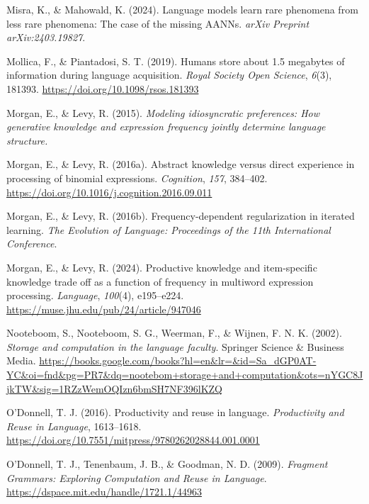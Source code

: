 \documentclass[
  12pt,
  letterpaper,
]{scrreprt}
\newlength{\cslhangindent}
\newenvironment{CSLReferences}[2] %
 {\begin{list}{}{%
  \setlength{\itemindent}{0pt}
  \setlength{\leftmargin}{0pt}
  \setlength{\parsep}{0pt}
  \ifodd #1
   \setlength{\leftmargin}{\cslhangindent}
   \setlength{\itemindent}{-1\cslhangindent}
  \fi
  \setlength{\itemsep}{#2\baselineskip}}}
 {\end{list}}
\begin{document}
\begin{CSLReferences}{1}{0}
Misra, K., \& Mahowald, K. (2024). Language models learn rare phenomena
from less rare phenomena: The case of the missing AANNs. \emph{arXiv
Preprint arXiv:2403.19827}.

Mollica, F., \& Piantadosi, S. T. (2019). Humans store about 1.5
megabytes of information during language acquisition. \emph{Royal
Society Open Science}, \emph{6}(3), 181393.
\url{https://doi.org/10.1098/rsos.181393}

Morgan, E., \& Levy, R. (2015). \emph{Modeling idiosyncratic
preferences: How generative knowledge and expression frequency jointly
determine language structure.}

Morgan, E., \& Levy, R. (2016a). Abstract knowledge versus direct
experience in processing of binomial expressions. \emph{Cognition},
\emph{157}, 384--402.
\url{https://doi.org/10.1016/j.cognition.2016.09.011}

Morgan, E., \& Levy, R. (2016b). Frequency-dependent regularization in
iterated learning. \emph{The Evolution of Language: Proceedings of the
11th International Conference}.

Morgan, E., \& Levy, R. (2024). Productive knowledge and item-specific
knowledge trade off as a function of frequency in multiword expression
processing. \emph{Language}, \emph{100}(4), e195--e224.
\url{https://muse.jhu.edu/pub/24/article/947046}

Nooteboom, S., Nooteboom, S. G., Weerman, F., \& Wijnen, F. N. K.
(2002). \emph{Storage and computation in the language faculty}. Springer
Science \& Business Media.
\url{https://books.google.com/books?hl=en&lr=&id=Sa_dGP0AT-YC&oi=fnd&pg=PR7&dq=nootebom+storage+and+computation&ots=nYGC8JjkTW&sig=1RZzWemOQIzn6bmSH7NF396lKZQ}

O'Donnell, T. J. (2016). Productivity and reuse in language.
\emph{Productivity and Reuse in Language}, 1613--1618.
\url{https://doi.org/10.7551/mitpress/9780262028844.001.0001}

O'Donnell, T. J., Tenenbaum, J. B., \& Goodman, N. D. (2009).
\emph{Fragment Grammars: Exploring Computation and Reuse in Language}.
\url{https://dspace.mit.edu/handle/1721.1/44963}


\end{CSLReferences}
\end{document}
